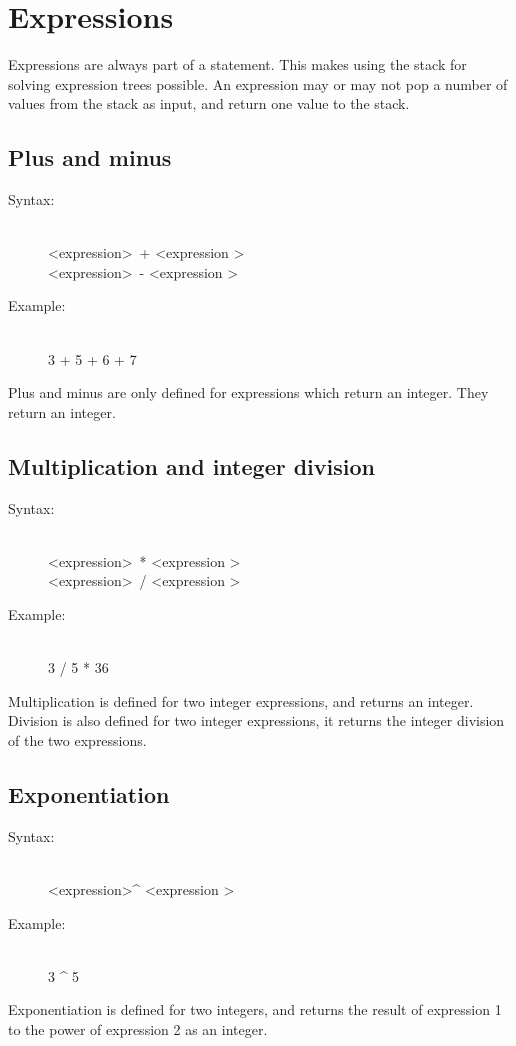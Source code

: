 \documentclass[10pt,a4paper]{report}
\begin{document}
\section{Expressions}
Expressions are always part of a statement. This makes using the stack for solving expression trees possible. An expression may or may not pop a number of values from the stack as input, and return one value to the stack. 

\subsection{Plus and minus}
\begin{description}
	\item[Syntax:] \hfill \\ 
		\textless expression\textgreater ~+ \textless expression \textgreater \\
		\textless expression\textgreater ~- \textless expression \textgreater
	\item[Example:] \hfill \\
		3 + 5 + 6 + 7 
\end{description} 
Plus and minus are only defined for expressions which return an integer. They return an integer.

\subsection{Multiplication and integer division}
\begin{description}
	\item[Syntax:] \hfill \\ 
		\textless expression\textgreater ~* \textless expression \textgreater \\
		\textless expression\textgreater ~/ \textless expression \textgreater
	\item[Example:] \hfill \\
		3 / 5 * 36
\end{description}
Multiplication is defined for two integer expressions, and returns an integer.
Division is also defined for two integer expressions, it returns the integer division of the two expressions. 

\subsection{Exponentiation}
\begin{description}
	\item[Syntax:] \hfill \\ 
		\textless expression\textgreater \^{} \textless expression \textgreater
	\item[Example:] \hfill \\
		3 \^{} 5
\end{description}
Exponentiation is defined for two integers, and returns the result of expression 1 to the power of expression 2 as an integer.
\end{document}
